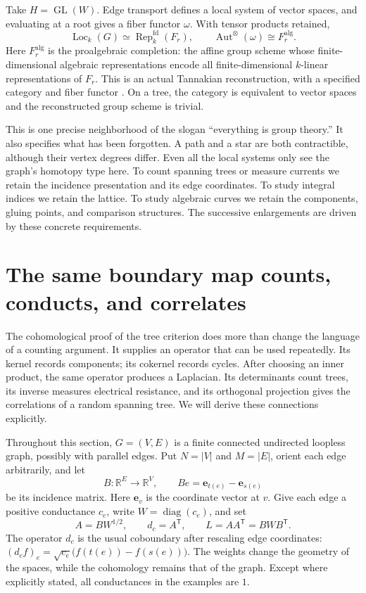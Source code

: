 \documentclass[11pt]{article}
\theoremstyle{definition}
\theoremstyle{remark}
\newcommand{\R}{\mathbb R}
\begin{document}
Take \(H=\operatorname{GL}(W)\). Edge transport defines a local system of vector spaces, and evaluating at a root gives a fiber functor \(\omega\). With tensor products retained,
\[
 \operatorname{Loc}_k(G)\simeq\operatorname{Rep}^{\mathrm{fd}}_k(F_r),
 \qquad
 \operatorname{Aut}^{\otimes}(\omega)\cong F_r^{\mathrm{alg}}.
\]
Here \(F_r^{\mathrm{alg}}\) is the proalgebraic completion: the affine group scheme whose finite-dimensional algebraic representations encode all finite-dimensional \(k\)-linear representations of \(F_r\). This is an actual Tannakian reconstruction, with a specified category and fiber functor \cite{rootMilne,rootDeninger}. On a tree, the category is equivalent to vector spaces and the reconstructed group scheme is trivial.

This is one precise neighborhood of the slogan ``everything is group theory.'' It also specifies what has been forgotten. A path and a star are both contractible, although their vertex degrees differ. Even all the local systems only see the graph's homotopy type here. To count spanning trees or measure currents we retain the incidence presentation and its edge coordinates. To study integral indices we retain the lattice. To study algebraic curves we retain the components, gluing points, and comparison structures. The successive enlargements are driven by these concrete requirements.


\section{The same boundary map counts, conducts, and correlates}
\label{sec:graph-linear}

The cohomological proof of the tree criterion does more than change the language of a counting argument. It supplies an operator that can be used repeatedly. Its kernel records components; its cokernel records cycles. After choosing an inner product, the same operator produces a Laplacian. Its determinants count trees, its inverse measures electrical resistance, and its orthogonal projection gives the correlations of a random spanning tree. We will derive these connections explicitly.

Throughout this section, $G=(V,E)$ is a finite connected undirected loopless graph, possibly with parallel edges. Put $N=|V|$ and $M=|E|$, orient each edge arbitrarily, and let
\[
 B:\R^E\longrightarrow\R^V,
 \qquad Be=\mathbf e_{t(e)}-\mathbf e_{s(e)}
\]
be its incidence matrix. Here $\mathbf e_v$ is the coordinate vector at $v$. Give each edge a positive conductance $c_e$, write $W=\operatorname{diag}(c_e)$, and set
\[
 A=BW^{1/2},\qquad d_c=A^{\mathsf T},\qquad
 L=AA^{\mathsf T}=BWB^{\mathsf T}.
\]
The operator $d_c$ is the usual coboundary after rescaling edge coordinates: $(d_cf)_e=\sqrt{c_e}\bigl(f(t(e))-f(s(e))\bigr)$. The weights change the geometry of the spaces, while the cohomology remains that of the graph. Except where explicitly stated, all conductances in the examples are $1$.
\end{document}
